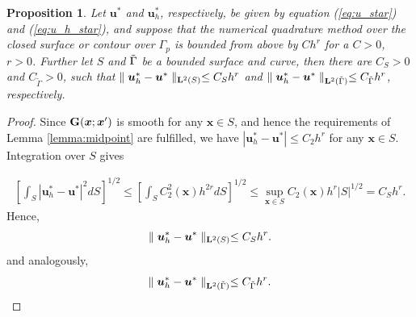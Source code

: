 \documentclass[pdflatex,sn-mathphys-num]{sn-jnl}
\newtheorem{proposition}{Proposition}%
\newtheorem*{lemma star}{Lemma}
\begin{document}
\begin{proposition}
\label{corr2}
    Let $\boldsymbol{u}^{\ast }$ and $\boldsymbol{u}_{h}^{\ast }$, respectively, be given by equation (\ref{eq:u_star}) and (\ref{eq:u_h_star}), and suppose that the numerical quadrature method over the closed surface or contour over $\Gamma_p$ is bounded from above by $C h^r$ for a $C > 0$, $r > 0$. Further let $S$ and $\Tilde{\Gamma}$ be a bounded surface and curve, then there are $C_S > 0$ and $C_{\tilde{\Gamma}}>0$, such that $\parallel \boldsymbol{u}_{h}^*-\boldsymbol{u}^*\parallel_{{\bf L}^2(S)} \leq {C_S}h^{r}$ and $\parallel \boldsymbol{u}_{h}^*-\boldsymbol{u}^*\parallel_{{\bf L}^2(\tilde{\Gamma})} \leq {C_{\tilde{\Gamma}}}h^{r}$, respectively.
\end{proposition} 
 \begin{proof}
     Since ${\bf G}(\boldsymbol{x};\boldsymbol{x}')$ is smooth for any $\boldsymbol{x} \in S$, and hence the requirements of Lemma \ref{lemma:midpoint} are fulfilled, we have $|{\boldsymbol u}_h^* - {\boldsymbol u}^*| \le C_2 h^{r}$ for any $\boldsymbol{x} \in S$. Integration over $S$ gives

\begin{equation*}
\begin{split}  
 \left[\int_{S}| \boldsymbol{u}_{h}^*-\boldsymbol{u}^*|^{2} d{S}\right]^{1/2}\leq \left[\int_{S}C_2^{2}({\boldsymbol{x}})h^{2r} d{S}\right]^{1/2}\le \sup_{\boldsymbol{x} \in S}C_2({\boldsymbol{x}})h^{r} |{S}|^{1/2}=C_S h^{r}.
\end{split}
\end{equation*}
Hence,
\begin{equation}
\parallel \boldsymbol{u}_{h}^*-\boldsymbol{u}^*\parallel _{{\bf L}^{2}(S
)}\leq {C_S}h^{r}.
\label{two}
\end{equation}
and analogously,
\begin{equation}
\parallel \boldsymbol{u}_{h}^*-\boldsymbol{u}^*\parallel _{{\bf L}^{2}(\Tilde{\Gamma}
)}\leq {C_{\tilde{\Gamma}}}h^{r}.
\label{three}
\end{equation}
\end{proof}
\end{document}
